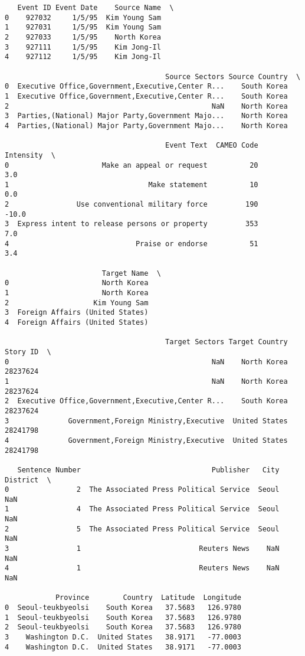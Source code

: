\documentclass[11pt]{article}
\begin{document}
\begin{verbatim}
   Event ID Event Date    Source Name  \
0    927032     1/5/95  Kim Young Sam   
1    927031     1/5/95  Kim Young Sam   
2    927033     1/5/95    North Korea   
3    927111     1/5/95    Kim Jong-Il   
4    927112     1/5/95    Kim Jong-Il   

                                      Source Sectors Source Country  \
0  Executive Office,Government,Executive,Center R...    South Korea   
1  Executive Office,Government,Executive,Center R...    South Korea   
2                                                NaN    North Korea   
3  Parties,(National) Major Party,Government Majo...    North Korea   
4  Parties,(National) Major Party,Government Majo...    North Korea   

                                      Event Text  CAMEO Code  Intensity  \
0                      Make an appeal or request          20        3.0   
1                                 Make statement          10        0.0   
2                Use conventional military force         190      -10.0   
3  Express intent to release persons or property         353        7.0   
4                              Praise or endorse          51        3.4   

                       Target Name  \
0                      North Korea   
1                      North Korea   
2                    Kim Young Sam   
3  Foreign Affairs (United States)   
4  Foreign Affairs (United States)   

                                      Target Sectors Target Country  Story ID  \
0                                                NaN    North Korea  28237624   
1                                                NaN    North Korea  28237624   
2  Executive Office,Government,Executive,Center R...    South Korea  28237624   
3              Government,Foreign Ministry,Executive  United States  28241798   
4              Government,Foreign Ministry,Executive  United States  28241798   

   Sentence Number                               Publisher   City District  \
0                2  The Associated Press Political Service  Seoul      NaN   
1                4  The Associated Press Political Service  Seoul      NaN   
2                5  The Associated Press Political Service  Seoul      NaN   
3                1                            Reuters News    NaN      NaN   
4                1                            Reuters News    NaN      NaN   

            Province        Country  Latitude  Longitude  
0  Seoul-teukbyeolsi    South Korea   37.5683   126.9780  
1  Seoul-teukbyeolsi    South Korea   37.5683   126.9780  
2  Seoul-teukbyeolsi    South Korea   37.5683   126.9780  
3    Washington D.C.  United States   38.9171   -77.0003  
4    Washington D.C.  United States   38.9171   -77.0003
\end{verbatim}
\end{document}

